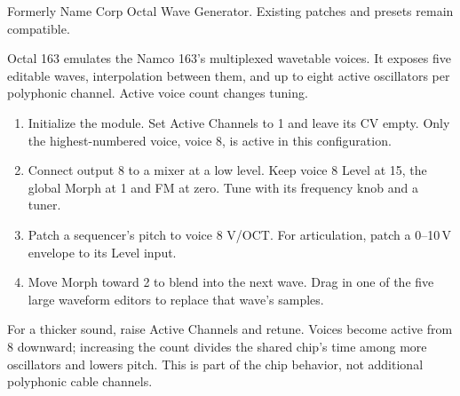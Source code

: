 Formerly Name Corp Octal Wave Generator. Existing patches and presets remain compatible.

Octal 163 emulates the Namco 163's multiplexed wavetable voices. It exposes
five editable waves, interpolation between them, and up to eight active
oscillators per polyphonic channel. Active voice count changes tuning.

\begin{enumerate}
\item Initialize the module. Set Active Channels to 1 and leave its CV empty.
Only the highest-numbered voice, voice 8, is active in this configuration.
\item Connect output 8 to a mixer at a low level. Keep voice 8 Level at 15,
the global Morph at 1 and FM at zero. Tune with its frequency knob and a tuner.
\item Patch a sequencer's pitch to voice 8 V/OCT. For articulation, patch a
0--10\,V envelope to its Level input.
\item Move Morph toward 2 to blend into the next wave. Drag in one of the
five large waveform editors to replace that wave's samples.
\end{enumerate}

For a thicker sound, raise Active Channels and retune. Voices become active
from 8 downward; increasing the count divides the shared chip's time among
more oscillators and lowers pitch. This is part of the chip behavior, not
additional polyphonic cable channels.

